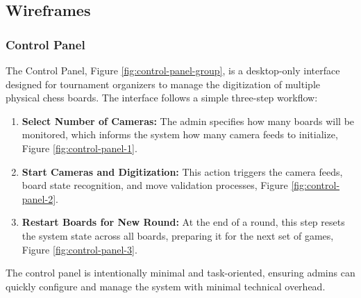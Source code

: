 \subsection{Wireframes}
\label{subsec:wireframe}

\subsubsection*{Control Panel}

The Control Panel, Figure \ref{fig:control-panel-group}, is a desktop-only interface designed for tournament organizers to manage the digitization of multiple physical chess boards. The interface follows a simple three-step workflow:

\begin{enumerate}
    \item \textbf{Select Number of Cameras:} The admin specifies how many boards will be monitored, which informs the system how many camera feeds to initialize, Figure \ref{fig:control-panel-1}.
    \item \textbf{Start Cameras and Digitization:} This action triggers the camera feeds, board state recognition, and move validation processes, Figure \ref{fig:control-panel-2}.
    \item \textbf{Restart Boards for New Round:} At the end of a round, this step resets the system state across all boards, preparing it for the next set of games, Figure \ref{fig:control-panel-3}.
\end{enumerate}

The control panel is intentionally minimal and task-oriented, ensuring admins can quickly configure and manage the system with minimal technical overhead.


